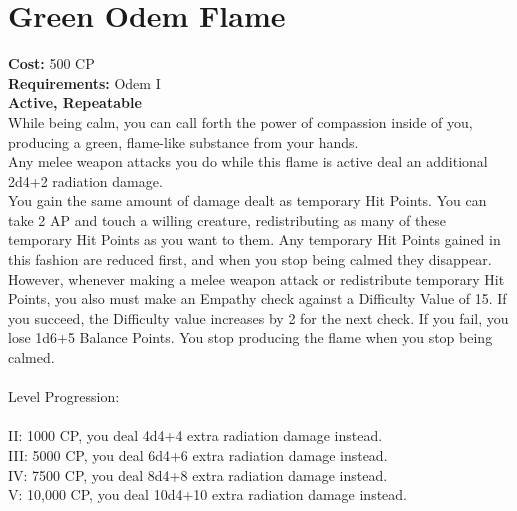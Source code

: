 \section{Green Odem Flame}
\textbf{Cost:} 500 CP\\
\textbf{Requirements:} Odem I\\
\textbf{Active, Repeatable}\\
While being calm, you can call forth the power of compassion inside of you, producing a green, flame-like substance from your hands.\\
Any melee weapon attacks you do while this flame is active deal an additional 2d4+2 radiation damage.\\
You gain the same amount of damage dealt as temporary Hit Points. You can take 2 AP and touch a willing creature, redistributing as many of these temporary Hit Points as you want to them. Any temporary Hit Points gained in this fashion are reduced first, and when you stop being calmed they disappear.\\
However, whenever making a melee weapon attack or redistribute temporary Hit Points, you also must make an Empathy check against a Difficulty Value of 15. If you succeed, the Difficulty value increases by 2 for the next check. If you fail, you lose 1d6+5 Balance Points. You stop producing the flame when you stop being calmed.\\ 
\\
Level Progression:\\
\\
II: 1000 CP, you deal 4d4+4 extra radiation damage instead.\\
III: 5000 CP, you deal 6d4+6 extra radiation damage instead.\\
IV: 7500 CP, you deal 8d4+8 extra radiation damage instead.\\
V: 10,000 CP, you deal 10d4+10 extra radiation damage instead.\\